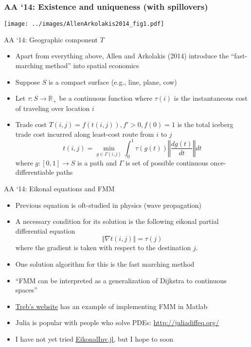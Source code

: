 \documentclass[10pt,notes=hide]{beamer}
\begin{document}
\begin{frame}
\frametitle{AA `14: Existence and uniqueness (with spillovers)}
\begin{center}
\texttt{[image: ../images/AllenArkolakis2014\_fig1.pdf]}
\end{center}
\end{frame}
\begin{frame}{AA `14: Geographic component $T$}
\begin{itemize}
	\item Apart from everything above, Allen and Arkolakis (2014) introduce the ``fast-marching method'' into spatial economics
	\item Suppose $S$ is a compact surface (e.g., line, plane, cow) 
	\item Let $\tau: S\to\mathbb{R}_{+}$ be a continuous function where $\tau(i)$ is the instantaneous cost of traveling over location $i$
	\item Trade cost $T(i,j) = f(t(i,j)), f'>0, f(0)=1$ is the total iceberg trade cost incurred along least-cost route from $i$ to $j$
	$$t(i,j) = \min_{g\in\Gamma(i,j)} \int_{0}^{1} \tau(g(t)) \left\Vert \frac{dg(t)}{dt} \right\Vert dt$$
	where $g:[0,1]\to S$ is a path and $\Gamma$ is set of possible continuous once-differentiable paths
\end{itemize}
\end{frame}
\begin{frame}{AA `14: Eikonal equations and FMM}
\begin{itemize}
	\item Previous equation is oft-studied in physics (wave propagation)
	\item A necessary condition for its solution is the following eikonal partial differential equation
	$$\left\Vert \nabla t(i,j) \right\Vert =\tau(j) $$
	where the gradient is taken with respect to the destination $j$.
	\item One solution algorithm for this is the fast marching method
	\item ``FMM can be interpreted as a generalization of Dijkstra to continuous spaces''
	\item \href{https://sites.google.com/site/treballen/research}{Treb's website} has an example of implementing FMM in Matlab
	\item Julia is popular with people who solve PDEs: \url{http://juliadiffeq.org/}
	\item I have not yet tried \href{https://github.com/JuliaInv/EikonalInv.jl}{EikonalInv.jl}, but I hope to soon
\end{itemize}
\end{frame}
\end{document}
